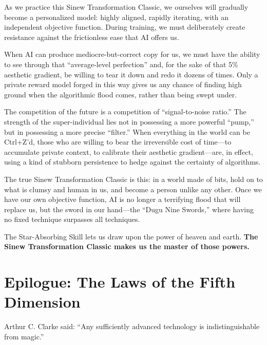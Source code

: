 \vspace{1em}

As we practice this Sinew Transformation Classic, we ourselves will gradually become a personalized model: highly aligned, rapidly iterating, with an independent objective function.
During training, we must deliberately create resistance against the frictionless ease that AI offers us.

\vspace{1em}

When AI can produce mediocre-but-correct copy for us,
we must have the ability to see through that ``average-level perfection''
and, for the sake of that 5\% aesthetic gradient, be willing to tear it down and redo it dozens of times.
Only a private reward model forged in this way
gives us any chance of finding high ground when the algorithmic flood comes, rather than being swept under.

\vspace{1em}

The competition of the future is a competition of ``signal-to-noise ratio.'' The strength of the super-individual lies not in possessing a more powerful ``pump,'' but in possessing a more precise ``filter.'' When everything in the world can be Ctrl+Z'd, those who are willing to bear the irreversible cost of time---to accumulate private context, to calibrate their aesthetic gradient---are, in effect, using a kind of stubborn persistence to hedge against the certainty of algorithms.

\vspace{1em}

The true Sinew Transformation Classic is this: in a world made of bits, hold on to what is clumsy and human in us, and become a person unlike any other. Once we have our own objective function, AI is no longer a terrifying flood that will replace us, but the sword in our hand---the ``Dugu Nine Swords,'' where having no fixed technique surpasses all techniques.

The Star-Absorbing Skill lets us draw upon the power of heaven and earth. \textbf{The Sinew Transformation Classic makes us the master of those powers.}
\newpage

\section{Epilogue: The Laws of the Fifth Dimension}

\begin{myquote}
    Arthur C. Clarke said: ``Any sufficiently advanced technology is indistinguishable from magic.''
\end{myquote}

